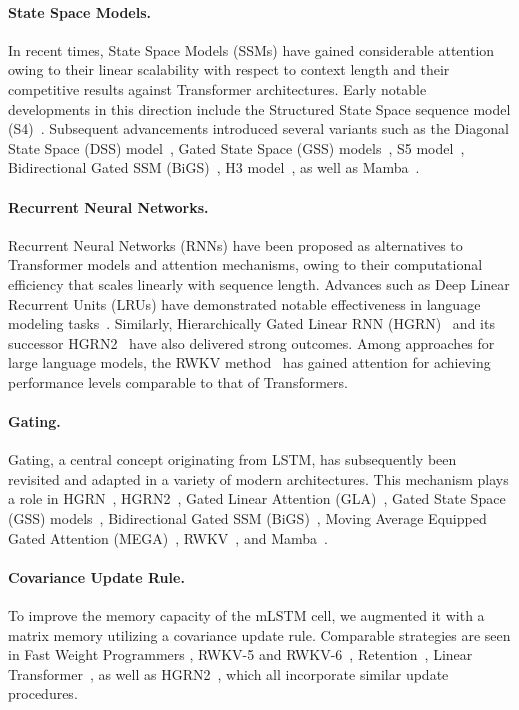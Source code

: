 \paragraph{State Space Models.} In recent times, State Space Models (SSMs) have gained considerable attention owing to their linear scalability with respect to context length and their competitive results against Transformer architectures. Early notable developments in this direction include the Structured State Space sequence model (S4)~\citep{Gu:21}. Subsequent advancements introduced several variants such as the Diagonal State Space (DSS) model~\citep{Gupta:22}, Gated State Space (GSS) models~\citep{Mehta:22}, S5 model~\citep{Smith:22}, Bidirectional Gated SSM (BiGS)~\citep{Wang:22}, H3 model~\citep{Fu:23}, as well as Mamba~\citep{Gu:24arxiv}.

\paragraph{Recurrent Neural Networks.} Recurrent Neural Networks (RNNs) have been proposed as alternatives to Transformer models and attention mechanisms, owing to their computational efficiency that scales linearly with sequence length. Advances such as Deep Linear Recurrent Units (LRUs) have demonstrated notable effectiveness in language modeling tasks~\citep{Orvieto:23, De:24arxiv}. Similarly, Hierarchically Gated Linear RNN (HGRN)~\citep{Qin:23} and its successor HGRN2~\citep{Qin:24arxiv} have also delivered strong outcomes. Among approaches for large language models, the RWKV method~\citep{Peng:23arxivshort,Peng:24arxivshort} has gained attention for achieving performance levels comparable to that of Transformers.

\paragraph{Gating.}
Gating, a central concept originating from LSTM, has subsequently been revisited and adapted in a variety of modern architectures. This mechanism plays a role in HGRN~\citep{Qin:23}, HGRN2~\citep{Qin:24arxiv}, Gated Linear Attention (GLA)~\citep{Yang:23arxiv}, Gated State Space (GSS) models~\citep{Mehta:22}, Bidirectional Gated SSM (BiGS)~\citep{Wang:22}, Moving Average Equipped Gated Attention (MEGA)~\citep{Ma:22}, RWKV~\citep{Peng:23arxivshort}, and Mamba~\citep{Gu:24arxiv}.

\paragraph{Covariance Update Rule.} To improve the memory capacity of the mLSTM cell, we augmented it with a matrix memory utilizing a covariance update rule. Comparable strategies are seen in Fast Weight Programmers \citep{Schmidhuber:92ncfastweights,Schlag:21}, RWKV-5 and RWKV-6~\citep{Peng:24arxivshort}, Retention~\citep{Sun:23arxiv}, Linear Transformer~\citep{Katharopoulos:20}, as well as HGRN2~\citep{Qin:24arxiv}, which all incorporate similar update procedures.

